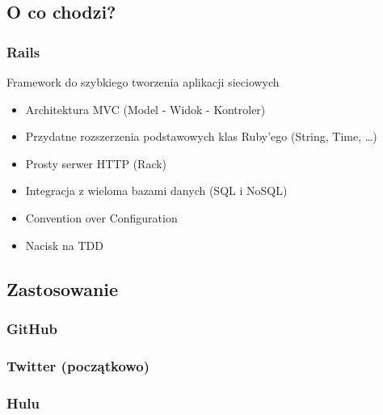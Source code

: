 \subsection{O co chodzi?}
\begin{frame}[fragile]
\frametitle{Rails}
\begin{block}{Framework do szybkiego tworzenia aplikacji sieciowych}
\begin{itemize}
\item{Architektura MVC (Model - Widok - Kontroler)}
\item{Przydatne rozszerzenia podstawowych klas Ruby'ego (String, Time, \ldots)}
\item{Prosty serwer HTTP (Rack)}
\item{Integracja z wieloma bazami danych (SQL i NoSQL)}
\item{Convention over Configuration}
\item{Nacisk na TDD}
\end{itemize}
\end{block}
\end{frame}


\subsection{Zastosowanie}
\begin{frame}[fragile]
\frametitle{GitHub}
\end{frame}

\begin{frame}[fragile]
\frametitle{Twitter (początkowo)}
\end{frame}

\begin{frame}[fragile]
\frametitle{Hulu}
\end{frame}
